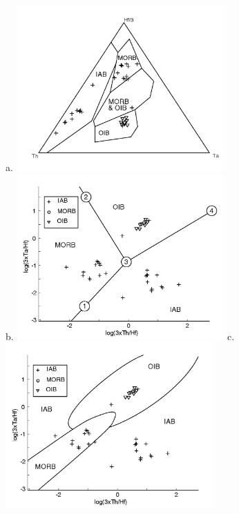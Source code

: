 \begin{figure}[htbp]
  \centering
a.  \includegraphics[width=300]{figures/Wood.jpg}\\
b.  \includegraphics[width=300]{figures/log_Th_Ta_Hf_lin.jpg}
c.  \includegraphics[width=300]{figures/log_Th_Ta_Hf_q.jpg}

\end{figure}
